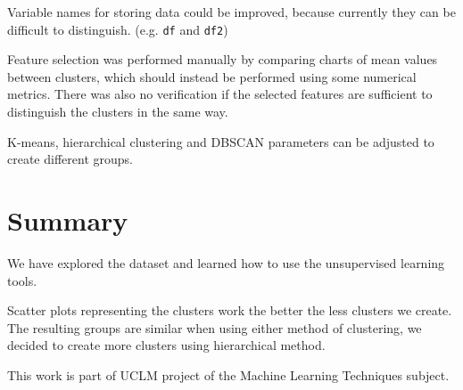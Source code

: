\documentclass[sigconf]{acmart}
\begin{document}
Variable names for storing data could be improved, because currently they can be difficult to distinguish. (e.g. \texttt{df} and \texttt{df2})

Feature selection was performed manually by comparing charts of mean values between clusters, which should instead be performed using some numerical metrics. There was also no verification if the selected features are sufficient to distinguish the clusters in the same way.

K-means, hierarchical clustering and DBSCAN parameters can be adjusted to create different groups.

\section{Summary}
We have explored the dataset and learned how to use the unsupervised learning tools.

Scatter plots representing the clusters work the better the less clusters we create.
The resulting groups are similar when using either method of clustering, we decided to create more clusters using hierarchical method.

%
%

\begin{acks}
This work is part of UCLM project of the Machine Learning Techniques subject.
\end{acks}

%
%
\end{document}
